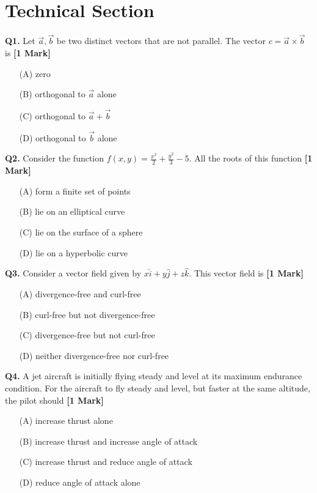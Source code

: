 \documentclass[11pt]{article}
\newcommand{\questiona}[2]{
    \noindent\textbf{Q#2.} #1 \hfill \textbf{[1 Mark]}
}
\begin{document}
\vspace{0.8cm}

\section*{Technical Section}

\questiona{Let $\vec{a}, \vec{b}$ be two distinct vectors that are not parallel. The vector $c = \vec{a} \times \vec{b}$ is}{1}
\begin{enumerate}
    \item[(A)] zero  
    \item[(B)] orthogonal to $\vec{a}$ alone  
    \item[(C)] orthogonal to $\vec{a} + \vec{b}$  
    \item[(D)] orthogonal to $\vec{b}$ alone  
\end{enumerate}

\vspace{0.5cm}

\questiona{Consider the function $f(x, y) = \frac{x^2}{2} + \frac{y^2}{3} - 5$. All the roots of this function}{2}
\begin{enumerate}
    \item[(A)] form a finite set of points  
    \item[(B)] lie on an elliptical curve  
    \item[(C)] lie on the surface of a sphere  
    \item[(D)] lie on a hyperbolic curve  
\end{enumerate}

\vspace{0.5cm}

\questiona{Consider a vector field given by $x\hat{i} + y\hat{j} + z\hat{k}$. This vector field is}{3}
\begin{enumerate}
    \item[(A)] divergence-free and curl-free  
    \item[(B)] curl-free but not divergence-free  
    \item[(C)] divergence-free but not curl-free  
    \item[(D)] neither divergence-free nor curl-free  
\end{enumerate}

\vspace{0.5cm}

\questiona{A jet aircraft is initially flying steady and level at its maximum endurance condition. For the aircraft to fly steady and level, but faster at the same altitude, the pilot should}{4}
\begin{enumerate}
    \item[(A)] increase thrust alone  
    \item[(B)] increase thrust and increase angle of attack  
    \item[(C)] increase thrust and reduce angle of attack  
    \item[(D)] reduce angle of attack alone  
\end{enumerate}
\end{document}
